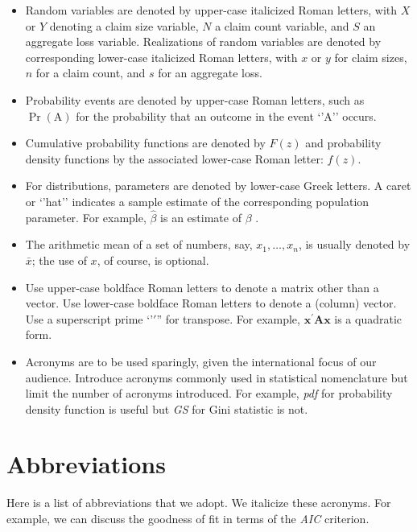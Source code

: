 \documentclass[]{book}
\providecommand{\tightlist}{%
  \setlength{\itemsep}{0pt}\setlength{\parskip}{0pt}}
\theoremstyle{definition}
\theoremstyle{definition}
\theoremstyle{definition}
\theoremstyle{remark}
\begin{document}
\begin{itemize}
\tightlist
\item
  Random variables are denoted by upper-case italicized Roman letters,
  with \(X\) or \(Y\) denoting a claim size variable, \(N\) a claim
  count variable, and \(S\) an aggregate loss variable. Realizations of
  random variables are denoted by corresponding lower-case italicized
  Roman letters, with \(x\) or \(y\) for claim sizes, \(n\) for a claim
  count, and \(s\) for an aggregate loss.
\item
  Probability events are denoted by upper-case Roman letters, such as
  \(\Pr(\mathrm{A})\) for the probability that an outcome in the event
  `'A'' occurs.
\item
  Cumulative probability functions are denoted by \(F(z)\) and
  probability density functions by the associated lower-case Roman
  letter: \(f(z)\).
\item
  For distributions, parameters are denoted by lower-case Greek letters.
  A caret or `'hat'' indicates a sample estimate of the corresponding
  population parameter. For example, \(\hat{\beta}\) is an estimate of
  \(\beta\) .
\item
  The arithmetic mean of a set of numbers, say, \(x_1, \ldots, x_n\), is
  usually denoted by \(\bar{x}\); the use of \(x\), of course, is
  optional.
\item
  Use upper-case boldface Roman letters to denote a matrix other than a
  vector. Use lower-case boldface Roman letters to denote a (column)
  vector. Use a superscript prime `'\(\prime\)'' for transpose. For
  example, \(\mathbf{x}^{\prime} \mathbf{A} \mathbf{x}\) is a quadratic
  form.
\item
  Acronyms are to be used sparingly, given the international focus of
  our audience. Introduce acronyms commonly used in statistical
  nomenclature but limit the number of acronyms introduced. For example,
  \emph{pdf} for probability density function is useful but \emph{GS}
  for Gini statistic is not.
\end{itemize}

\section{Abbreviations}\label{S:Abbreviations}

Here is a list of abbreviations that we adopt. We italicize these
acronyms. For example, we can discuss the goodness of fit in terms of
the \emph{AIC} criterion.
\end{document}
